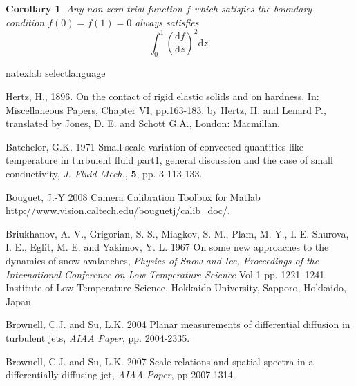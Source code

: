\documentclass[lineno]{jfm}
\newtheorem{corollary}{Corollary}
\begin{document}
{{\begin{corollary}
Any non-zero trial function $f$ which satisfies the boundary condition
$f(0)=f(1)=0$ always satisfies
\begin{equation}
  \int_0^1 \left( \frac{\mathrm{d} f}{\mathrm{d} z} \right)^2 \mathrm{d} z.
\end{equation}
\end{corollary}


%
%


%

\begin{thebibliography}{99}

\expandafter\ifx\csname natexlab\endcsname\relax
\def\natexlab#1{#1}\fi
\expandafter\ifx\csname selectlanguage\endcsname\relax
\def\selectlanguage#1{\relax}\fi


Hertz, H., 1896. On the contact of rigid elastic solids and on hardness, In: Miscellaneous Papers, Chapter VI, pp.163-183. by Hertz, H. and Lenard P., translated by Jones, D. E. and Schott G.A., London: Macmillan.

{\sc Batchelor, G.K.} 1971 {Small-scale variation of convected quantities like temperature in turbulent fluid part1, general discussion and the case of small conductivity}, {\it J. Fluid Mech.}, {\bf 5}, pp. 3-113-133.

{\sc Bouguet, J.-Y} 2008 Camera Calibration Toolbox for Matlab {\url{http://www.vision.caltech.edu/bouguetj/calib_doc/}}.

{\sc Briukhanov, A. V.,   Grigorian, S. S., Miagkov,  S. M., Plam, M. Y.,   I. E. Shurova, I. E.,   Eglit, M. E. and Yakimov, Y. L.} 1967
{On some new approaches to the dynamics of snow avalanches},
{\it Physics of Snow and Ice,  Proceedings of the International Conference on Low Temperature Science}
{Vol 1} pp. 1221--1241 {Institute of Low Temperature Science, Hokkaido University, Sapporo, Hokkaido, Japan}.

 {\sc Brownell,  C.J.  and Su,  L.K.} 2004  {Planar measurements of differential diffusion in turbulent jets}, {\it AIAA Paper},  pp. 2004-2335.

  {\sc Brownell, C.J. and  Su, L.K.} 2007 {Scale relations and spatial spectra in a differentially diffusing jet}, {\it AIAA Paper}, pp 2007-1314.


\end{thebibliography}}}
\end{document}
